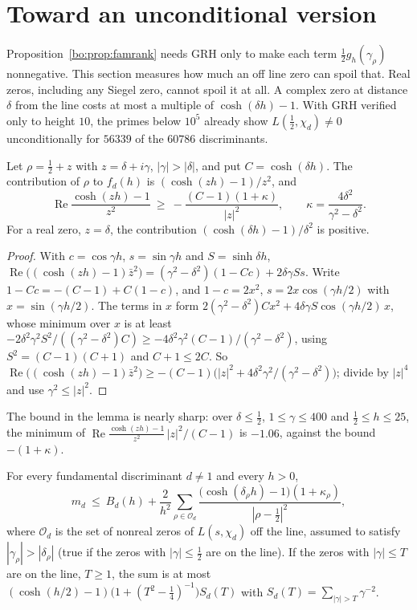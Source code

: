 \section{Toward an unconditional version}\label{bo:sec:oscuncond}

Proposition~\ref{bo:prop:famrank} needs GRH only to make each term $\frac12g_h(\gamma_\rho)$ nonnegative. This section measures how much an off line zero can spoil that. Real zeros, including any Siegel zero, cannot spoil it at all. A complex zero at distance $\delta$ from the line costs at most a multiple of $\cosh(\delta h)-1$. With GRH verified only to height $10$, the primes below $10^5$ already show $L(\frac12,\chi_d)\ne0$ unconditionally for $56339$ of the $60786$ discriminants.

\begin{lemma}\label{bo:lem:offline}
Let $\rho=\frac12+z$ with $z=\delta+i\gamma$, $|\gamma|>|\delta|$, and put $C=\cosh(\delta h)$. The contribution of $\rho$ to $f_d(h)$ is $(\cosh(zh)-1)/z^2$, and
\[
\operatorname{Re}\frac{\cosh(zh)-1}{z^2}\ \ge\ -\frac{(C-1)(1+\kappa)}{|z|^2},\qquad \kappa=\frac{4\delta^2}{\gamma^2-\delta^2}.
\]
For a real zero, $z=\delta$, the contribution $(\cosh(\delta h)-1)/\delta^2$ is positive.
\end{lemma}

\begin{proof}
With $c=\cos\gamma h$, $s=\sin\gamma h$ and $S=\sinh\delta h$, $\operatorname{Re}\bigl((\cosh(zh)-1)\bar z^2\bigr)=(\gamma^2-\delta^2)(1-Cc)+2\delta\gamma Ss$. Write $1-Cc=-(C-1)+C(1-c)$, and $1-c=2x^2$, $s=2x\cos(\gamma h/2)$ with $x=\sin(\gamma h/2)$. The terms in $x$ form $2(\gamma^2-\delta^2)Cx^2+4\delta\gamma S\cos(\gamma h/2)\,x$, whose minimum over $x$ is at least $-2\delta^2\gamma^2S^2/((\gamma^2-\delta^2)C)\ge-4\delta^2\gamma^2(C-1)/(\gamma^2-\delta^2)$, using $S^2=(C-1)(C+1)$ and $C+1\le2C$. So $\operatorname{Re}\bigl((\cosh(zh)-1)\bar z^2\bigr)\ge-(C-1)\bigl(|z|^2+4\delta^2\gamma^2/(\gamma^2-\delta^2)\bigr)$; divide by $|z|^4$ and use $\gamma^2\le|z|^2$.
\end{proof}

The bound in the lemma is nearly sharp: over $\delta\le\frac12$, $1\le\gamma\le400$ and $\frac12\le h\le25$, the minimum of $\operatorname{Re}\frac{\cosh(zh)-1}{z^2}\,|z|^2/(C-1)$ is $-1.06$, against the bound $-(1+\kappa)$.

\begin{theorem}\label{bo:thm:uncond}
For every fundamental discriminant $d\ne1$ and every $h>0$,
\[
m_d\ \le\ B_d(h)+\frac{2}{h^2}\sum_{\rho\in\mathcal O_d}\frac{\bigl(\cosh(\delta_\rho h)-1\bigr)(1+\kappa_\rho)}{|\rho-\frac12|^2},
\]
where $\mathcal O_d$ is the set of nonreal zeros of $L(s,\chi_d)$ off the line, assumed to satisfy $|\gamma_\rho|>|\delta_\rho|$ (true if the zeros with $|\gamma|\le\frac12$ are on the line).
If the zeros with $|\gamma|\le T$ are on the line, $T\ge1$, the sum is at most $(\cosh(h/2)-1)\bigl(1+(T^2-\frac14)^{-1}\bigr)S_d(T)$ with $S_d(T)=\sum_{|\gamma|>T}\gamma^{-2}$.
\end{theorem}

